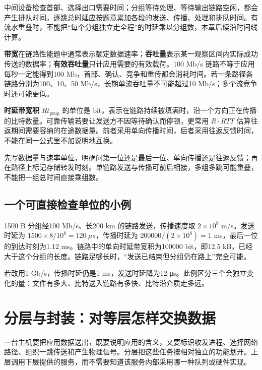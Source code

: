 中间设备检查首部、选择出口需要时间；分组等待处理、等待输出链路空闲，都会产生排队时间。逐跳总时延应按题意累加各段的发送、传播、处理和排队时间。有流水重叠时，不能把``每个分组独立走全程''的时延乘以分组数，本章后续沿时间线计算。

\textbf{带宽}在链路性能题中通常表示额定数据速率；\textbf{吞吐量}表示某一观察区间内实际成功传送的数据率；\textbf{有效吞吐量}只计应用需要的有效载荷。100 Mb/s 链路不等于应用每秒一定能得到100 Mb，首部、确认、竞争和重传都会消耗时间。若一条路径各链路分别为100、10、50 Mb/s，长期单流吞吐量不可能超过10 Mb/s；多个流竞争时还可能更低。

\textbf{时延带宽积} \(R t_{\mathrm{prop}}\) 的单位是 bit，表示在链路持续被填满时，沿一个方向正在传播的比特数量。可靠传输若要让发送方不因等待确认而停顿，更常用 \(R\cdot RTT\) 估算往返期间需要容纳的在途数据量。前者采用单向传播时间，后者采用往返反馈时间，不能在同一公式里不加说明地互换。

\begin{methodbox}[性能题先固定边界]

先写数据量与速率单位，明确问第一位还是最后一位、单向传播还是往返反馈；再在路径上标记存储转发时刻。单链路发送与传播可前后相接，多组多跳可能重叠，不能把一组总时间直接乘组数。

\end{methodbox}

\subsection{一个可直接检查单位的小例}\label{CN01-sub01}

1500 B 分组经100 Mb/s、长200 km 的链路发送，传播速度取 \(2\times10^8\) m/s。发送时延为 \(1500\times8/10^8=120\ \mu s\)，传播时延为 \(200000/(2\times10^8)=1\) ms，最后一位的到达时刻为1.12 ms。链路中的单向时延带宽积为100000 bit，即12.5 kB，已经大于这个分组的长度。链路足够长时，``发送已结束但分组仍在路上''完全可能。

若改用1 Gb/s，传播时延仍是1 ms，发送时延降为12 μs。此例区分三个会独立变化的量：文件有多大、比特送入链路有多快、比特沿介质走多远。

\section{分层与封装：对等层怎样交换数据}\label{CN01-04}

一台主机要把应用数据送出，既要说明应用的含义，又要标识收发进程、选择网络路径、组织一跳传送和产生物理信号。分层把这些任务按相对独立的功能划开。上层调用下层提供的服务，而不需要知道该服务内部采用哪一种队列或硬件实现。

